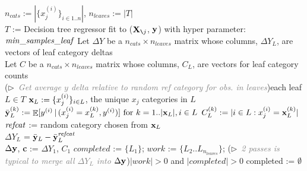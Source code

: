\documentclass[]{article} %
\newcommand{\cut}[1]{}
\newcommand{\Xnj}{${\bf X}_{\texttt{\char`\\} j}$}
\DeclareMathOperator{\Ex}{\mathbb{E}}
\begin{document}
\setlength{\algomargin}{5pt}
\begin{algorithm}[H]
\SetAlgoLined
\DontPrintSemicolon
{}
\SetAlgoSkip{}

\cut{
\KwOut{$\begin{array}[t]{l}
\Delta^{(k)} = \text{category } k \text{'s effect on } y \text{ where } mean(\Delta^{(k)})=0\\
n^{(k)} = \text{number of supported observations per category $k$}\\
\end{array}$
}
}
$n_{cats} := |\{x_j^{(i)}\}_{i \in 1..n}|$, $n_{leaves} := |T|$\\
$T$ := Decision tree regressor fit to (\Xnj{}, $\bf y$) with hyper parameter: ${\it min\_samples\_leaf}$\;
Let $\Delta Y$ be a $n_{cats} \times n_{leaves}$ matrix whose columns, $\Delta Y_L$, are vectors of leaf category deltas\\
Let $C$ be a $n_{cats} \times n_{leaves}$ matrix whose columns, $C_L$, are vectors for leaf category counts\\
\For(\hfill$\triangleright$\ {\it\textcolor{gray}{\small Get average $y$ delta relative to random ref category for obs. in leaves}}){each leaf $L \in T$}{
        ${\bf x}_L := \{x_j^{(i)}\}_{i \in L}$, the unique $x_j$ categories in $L$
        $\bar{\bf y}_L^{(k)} := \Ex[ y^{(i)} \,|\, (x_j^{(i)}=x_L^{(k)},  y^{(i)})] \text{ for } k = 1..|{\bf x}_L|, i \in L$
        $C_L^{(k)} := |i \in L : x_j^{(i)}={\bf x}_L^{(k)}|$
	${\it refcat}$ := random category chosen from ${\bf x}_L$\\
	$\Delta {Y}_L$ = $\bar{\bf y}_L - \bar{\bf y}_L^{\it refcat}$\\
}
$\Delta {\bf y}$, {\bf c} := $\Delta {Y}_1$, $C_1$
$completed$ := $\{L_1\}$; $work$ := $\{L_2 .. L_{n_{leaves}}\}$; 
\While(\hfill$\triangleright$\ {\it\textcolor{gray}{\small 2 passes is typical to merge all $\Delta {Y}_L$ into $\Delta {\bf y}$}}){$|work| > 0$ and $|completed|>0$}{
    completed := $\emptyset$\\
    }
\end{algorithm}
\end{document}
